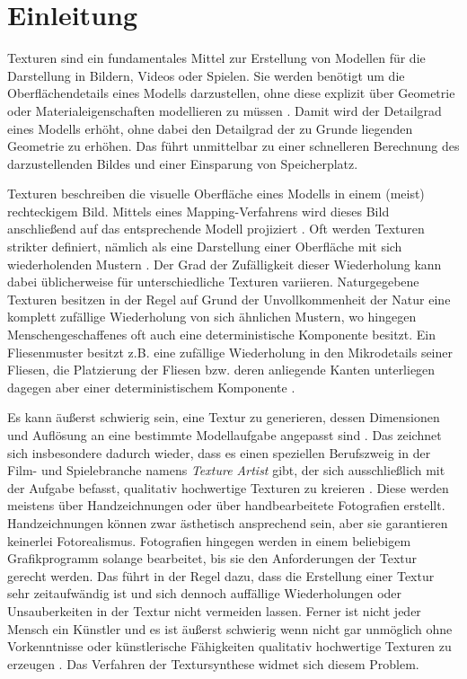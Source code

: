 \section{Einleitung}

Texturen sind ein fundamentales Mittel zur Erstellung von Modellen für die Darstellung in Bildern, Videos oder Spielen.
Sie werden benötigt um die Oberflächendetails eines Modells darzustellen, ohne diese explizit über Geometrie oder Materialeigenschaften modellieren zu müssen \cite{StateOfTheArt}.
Damit wird der Detailgrad eines Modells erhöht, ohne dabei den Detailgrad der zu Grunde liegenden Geometrie zu erhöhen.
Das führt unmittelbar zu einer schnelleren Berechnung des darzustellenden Bildes und einer Einsparung von Speicherplatz.

Texturen beschreiben die visuelle Oberfläche eines Modells in einem (meist) rechteckigem Bild.
Mittels eines Mapping-Verfahrens wird dieses Bild anschließend auf das entsprechende Modell projiziert \cite{SelfTuning}.
Oft werden Texturen strikter definiert, nämlich als eine Darstellung einer Oberfläche mit sich wiederholenden Mustern \cite{StateOfTheArt}.
Der Grad der Zufälligkeit dieser Wiederholung kann dabei üblicherweise für unterschiedliche Texturen variieren.
Naturgegebene Texturen besitzen in der Regel auf Grund der Unvollkommenheit der Natur eine komplett zufällige Wiederholung von sich ähnlichen Mustern, wo hingegen Menschengeschaffenes oft auch eine deterministische Komponente besitzt.
Ein Fliesenmuster besitzt z.B. eine zufällige Wiederholung in den Mikrodetails seiner Fliesen, die Platzierung der Fliesen bzw. deren anliegende Kanten unterliegen dagegen aber einer deterministischem Komponente \cite{StateOfTheArt}.

Es kann äußerst schwierig sein, eine Textur zu generieren, dessen Dimensionen und Auflösung an eine bestimmte Modellaufgabe angepasst sind \cite{SelfTuning}.
Das zeichnet sich insbesondere dadurch wieder, dass es einen speziellen Berufszweig in der Film- und Spielebranche namens \emph{Texture Artist} gibt, der sich ausschließlich mit der Aufgabe befasst, qualitativ hochwertige Texturen zu kreieren \cite{StateOfTheArt}.
Diese werden meistens über Handzeichnungen oder über handbearbeitete Fotografien erstellt.
Handzeichnungen können zwar ästhetisch ansprechend sein, aber sie garantieren keinerlei Fotorealismus.
Fotografien hingegen werden in einem beliebigem Grafikprogramm solange bearbeitet, bis sie den Anforderungen der Textur gerecht werden.
Das führt in der Regel dazu, dass die Erstellung einer Textur sehr zeitaufwändig ist und sich dennoch auffällige Wiederholungen oder Unsauberkeiten in der Textur nicht vermeiden lassen.
Ferner ist nicht jeder Mensch ein Künstler und es ist äußerst schwierig wenn nicht gar unmöglich ohne Vorkenntnisse oder künstlerische Fähigkeiten qualitativ hochwertige Texturen zu erzeugen \cite{StateOfTheArt}.
Das Verfahren der Textursynthese widmet sich diesem Problem.